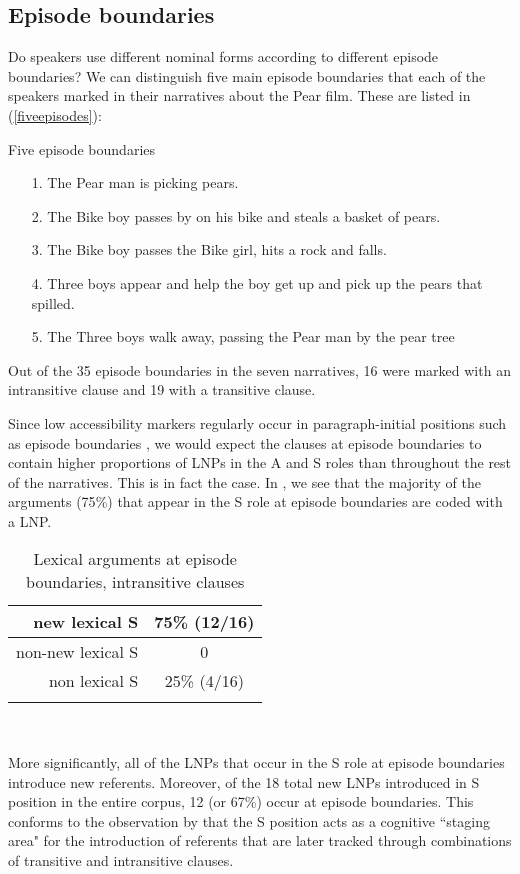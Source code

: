 \subsection{Episode boundaries}\label{episodeboundaries}

Do speakers use different nominal forms according to different episode boundaries? We can distinguish five main episode boundaries that each of the speakers marked in their narratives about the Pear film. These are listed in (\ref{fiveepisodes}):

\ea\label{fiveepisodes} Five episode boundaries
\begin{itemize}
\item[1.] The Pear man is picking pears. 
\item[2.] The Bike boy passes by on his bike and steals a basket of pears. 
\item[3.] The Bike boy passes the Bike girl, hits a rock and falls. 
\item[4.] Three boys appear and help the boy get up and pick up the pears that spilled.
\item[5.] The Three boys walk away, passing the Pear man by the pear tree
\end{itemize}
\z
 Out of the 35 episode boundaries in the seven narratives, 16 were marked with an intransitive clause and 19 with a transitive clause.

Since low accessibility markers regularly occur in paragraph-initial positions such as episode boundaries \citep[52]{ariel2001}, we would expect the clauses at episode boundaries to contain higher proportions of LNPs in the A and S roles than throughout the rest of the narratives. This is in fact the case. In , we see that the majority of the arguments (75{\%}) that appear in the S role at episode boundaries are coded with a LNP. 
\begin{table} 

\caption{{Lexical arguments at episode boundaries, intransitive clauses}}
\begin{tabular}{| r  c }
\lsptoprule
new lexical S & 75{\%} (12/16) \\

\midrule
non-new lexical S & 0 \\

\midrule
non lexical S & 25{\%} (4/16)  \\

\lspbottomrule
\end{tabular}\\
\label{episodeintr}

\end{table}
More significantly, all of the LNPs that occur in the S role at episode boundaries introduce new referents. Moreover, of the 18 total new LNPs introduced in S position in the entire corpus, 12 (or 67{\%}) occur at episode boundaries. This conforms to the observation by \citet[831]{dubois1987} that the S position acts as a cognitive ``staging area" for the introduction of referents that are later tracked through combinations of transitive and intransitive clauses.

